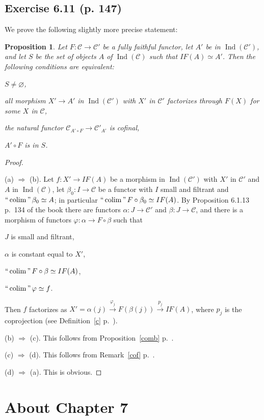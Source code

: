 \documentclass[12pt]{article}%
\newtheorem{prop}[thm]{Proposition}
\theoremstyle{remark}
\theoremstyle{definition}
\newcommand{\nn}{\noindent}
\newcommand{\cc}{\mathcal}
\newcommand{\pp}{\varphi}
\newcommand{\then}{\Rightarrow}
\newcommand{\xr}{\xrightarrow}
\DeclareMathOperator*{\colim}{colim}%
\DeclareMathOperator*{\ic}{``\colim"}
\DeclareMathOperator{\Ind}{Ind}
\begin{document}

\subsection{Exercise 6.11 (p. 147)} 

We prove the following slightly more precise statement:
%
\begin{prop}\label{myprop1}
%
Let $F:\cc C\to\cc C'$ be a fully faithful functor, let $A'$ be in $\Ind(\cc C')$, and let $S$ be the set of objects $A$ of $\Ind(\cc C)$ such that $IF(A)\simeq A'$. Then the following conditions are equivalent: 

\nn{\em(a)} $S\neq\varnothing$, 

\nn{\em(b)} all morphism $X'\to A'$ in $\Ind(\cc C')$ with $X'$ in $\cc C'$ factorizes through $F(X)$ for some $X$ in $\cc C$, 

\nn{\em(c)} the natural functor $\cc C_{A'\circ F}\to\cc C'_{A'}$ is cofinal, 

\nn{\em(d)} $A'\circ F$ is in $S$.
%
\end{prop}
%
\begin{proof}\ 

\nn(a) $\then$ (b). Let $f:X'\to IF(A)$ be a morphism in $\Ind(\cc C')$ with $X'$ in $\cc C'$ and $A$ in $\Ind(\cc C)$, let $\beta_0:I\to\cc C$ be a functor with $I$ small and filtrant and $\ic\beta_0\simeq A$; in particular $\ic F\circ\beta_0\simeq IF(A)$. By Proposition 6.1.13 p.~134 of the book there are functors $\alpha:J\to\cc C'$ and $\beta:J\to\cc C$, and there is a morphism of functors $\pp:\alpha\to F\circ\beta$ such that 

$J$ is small and filtrant, 

$\alpha$ is constant equal to $X'$, 

$\ic F\circ\beta\simeq IF(A)$, 

$\ic\pp\simeq f$. 

\nn Then $f$ factorizes as $X'=\alpha(j)\xr{\pp_j}F(\beta(j))\xr{p_j}IF(A)$, where $p_j$ is the coprojection (see Definition~\ref{c} p.~\pageref{c}).

\nn(b) $\then$ (c). This follows from Proposition~\ref{comb} p.~\pageref{comb}. 

\nn(c) $\then$ (d). This follows from Remark~\ref{cof} p.~\pageref{cof}. 

\nn(d) $\then$ (a). This is obvious.
\end{proof}


\section{About Chapter 7}
\end{document}
